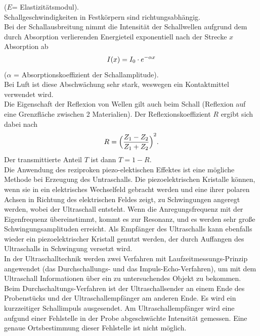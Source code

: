 \noindent ($E$= Elastizitätsmodul).\\
\noindent 
Schallgeschwindigkeiten in Festkörpern sind richtungsabhängig.\\
\noindent
Bei der Schallausbreitung nimmt die Intensität der Schallwellen  aufgrund dem durch Absorption verlierenden Energieteil  exponentiell nach der Strecke $x$ Absorption ab
\begin{equation}
    I(x) = I_0 \cdot e^{- \alpha x }\\
\end{equation}
\noindent ($\alpha$ = Absorptionskoeffizient der Schallamplitude). \\
\noindent Bei Luft ist diese Abschwächung sehr stark, weswegen ein Kontaktmittel verwendet wird.\\
\noindent Die Eigenschaft der Reflexion von Wellen gilt auch beim Schall (Reflexion auf eine Grenzfläche zwischen 2 Materialien).
 Der Reflexionskoeffizient $R$ ergibt sich dabei nach
\begin{equation}
    R= {\Bigl(\frac{Z_1-Z_2}{Z_1+Z_2}\Bigr)}^2.\\
\end{equation}
\noindent
Der transmittierte Anteil $T$ ist dann $T= 1-R$.\\
\noindent 
Die Anwendung des reziproken piezo-elektischen Effektes ist eine mögliche Methode bei Erzeugung des Untraschalls. Die piezoelektrischen Kristalle können, wenn sie in
ein elektrisches Wechselfeld gebracht werden und eine ihrer polaren Achsen in Richtung des elektrischen Feldes zeigt, zu Schwingungen angeregt werden, wobei der Ultraschall entsteht. Wenn die Anregungsfrequenz mit der Eigenfrequenz übereinstimmt, kommt es zur
Resonanz, und es werden sehr große Schwingungsamplituden erreicht. Als Empfänger des Ultraschalls kann ebenfalls wieder ein piezoelektrischer Kristall genutzt werden, der durch Auffangen des Ultraschalls in Schwingung versetzt wird.\\
\noindent In der Ultraschalltechnik werden zwei Verfahren mit Laufzeitmessungs-Prinzip angewendet (das Durchschallungs- und das Impuls-Echo-Verfahren), um mit dem Ultraschall Informationen über ein zu
untersuchendes Objekt zu bekommen.\\
Beim Durchschaltungs-Verfahren ist der Ultraschallsender an einem Ende des Probenstücks und der Ultraschallempfänger am anderen Ende. Es wird ein kurzzeitiger Schallimpuls ausgesendet. 
Am Ultraschallempfänger wird eine aufgund einer Fehlstelle in der Probe abgeschwächte Intensität gemessen. Eine genaue Ortsbestimmung dieser Fehlstelle ist nicht möglich.\\

